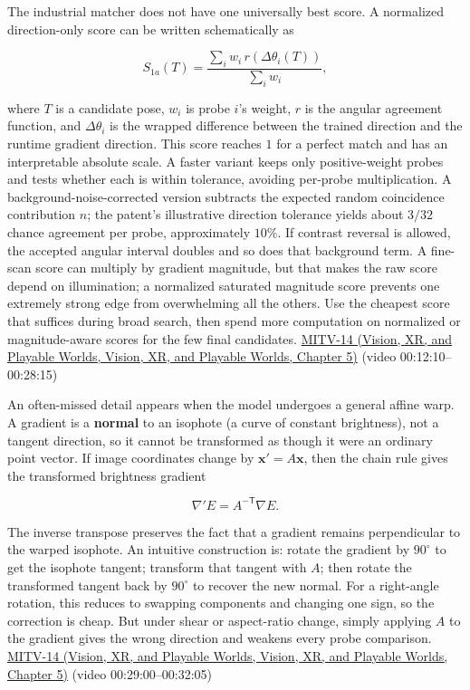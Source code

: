 The industrial matcher does not have one universally best score. A normalized direction-only score can be written schematically as

\[
S_{1a}(T)=\frac{\sum_i w_i\,r(\Delta\theta_i(T))}{\sum_i w_i},
\]

where \(T\) is a candidate pose, \(w_i\) is probe \(i\)'s weight, \(r\) is the angular agreement function, and \(\Delta\theta_i\) is the wrapped difference between the trained direction and the runtime gradient direction. This score reaches \(1\) for a perfect match and has an interpretable absolute scale. A faster variant keeps only positive-weight probes and tests whether each is within tolerance, avoiding per-probe multiplication. A background-noise-corrected version subtracts the expected random coincidence contribution \(n\); the patent's illustrative direction tolerance yields about \(3/32\) chance agreement per probe, approximately \(10\%\). If contrast reversal is allowed, the accepted angular interval doubles and so does that background term. A fine-scan score can multiply by gradient magnitude, but that makes the raw score depend on illumination; a normalized saturated magnitude score prevents one extremely strong edge from overwhelming all the others. Use the cheapest score that suffices during broad search, then spend more computation on normalized or magnitude-aware scores for the few final candidates. \href{../07-Vision-XR-and-Playable-Worlds/main.pdf\#nameddest=04-visual-computing-ii-ch036-mitv-14---inspection-in-patquick-hough-transform-homography-position-determination-multi-scale}{MITV-14 (Vision, XR, and Playable Worlds, Vision, XR, and Playable Worlds, Chapter 5)} (video 00:12:10--00:28:15)

An often-missed detail appears when the model undergoes a general affine warp. A gradient is a \textbf{normal} to an isophote (a curve of constant brightness), not a tangent direction, so it cannot be transformed as though it were an ordinary point vector. If image coordinates change by \(\mathbf{x}'=A\mathbf{x}\), then the chain rule gives the transformed brightness gradient

\[
\nabla' E=A^{-\mathsf T}\nabla E.
\]

The inverse transpose preserves the fact that a gradient remains perpendicular to the warped isophote. An intuitive construction is: rotate the gradient by \(90^\circ\) to get the isophote tangent; transform that tangent with \(A\); then rotate the transformed tangent back by \(90^\circ\) to recover the new normal. For a right-angle rotation, this reduces to swapping components and changing one sign, so the correction is cheap. But under shear or aspect-ratio change, simply applying \(A\) to the gradient gives the wrong direction and weakens every probe comparison. \href{../07-Vision-XR-and-Playable-Worlds/main.pdf\#nameddest=04-visual-computing-ii-ch036-mitv-14---inspection-in-patquick-hough-transform-homography-position-determination-multi-scale}{MITV-14 (Vision, XR, and Playable Worlds, Vision, XR, and Playable Worlds, Chapter 5)} (video 00:29:00--00:32:05)

